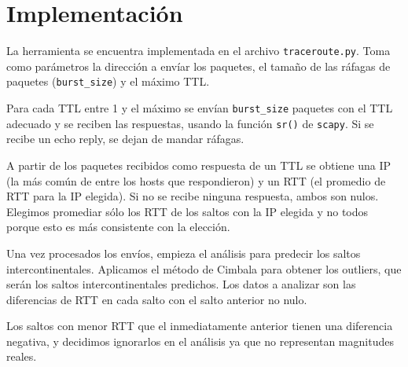 \section{Implementación}
La herramienta se encuentra implementada en el archivo \texttt{traceroute.py}. Toma como parámetros la dirección a envíar los paquetes, el tamaño de las ráfagas de paquetes (\texttt{burst\_size}) y el máximo TTL.

Para cada TTL entre 1 y el máximo se envían \texttt{burst\_size} paquetes con el TTL adecuado y se reciben las respuestas, usando la función \texttt{sr()} de \texttt{scapy}. Si se recibe un echo reply, se dejan de mandar ráfagas.

A partir de los paquetes recibidos como respuesta de un TTL se obtiene una IP (la más común de entre los hosts que respondieron) y un RTT (el promedio de RTT para la IP elegida). Si no se recibe ninguna respuesta, ambos son nulos. Elegimos promediar sólo los RTT de los saltos con la IP elegida y no todos porque esto es más consistente con la elección.

Una vez procesados los envíos, empieza el análisis para predecir los saltos intercontinentales. Aplicamos el método de Cimbala para obtener los outliers, que serán los saltos intercontinentales predichos. Los datos a analizar son las diferencias de RTT en cada salto con el salto anterior no nulo. 

Los saltos con menor RTT que el inmediatamente anterior tienen una diferencia negativa, y decidimos ignorarlos en el análisis ya que no representan magnitudes reales.

